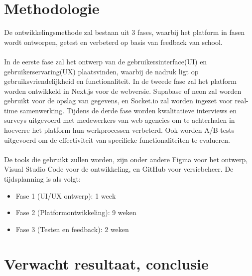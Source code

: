 

\section{Methodologie}%
\label{sec:methodologie}

De ontwikkelingsmethode zal bestaan uit 3 fases, waarbij het platform in fasen wordt ontworpen, getest en verbeterd op basis van feedback van school.
\\
\\
In de eerste fase zal het ontwerp van de gebruikersinterface(UI) en gebruikerservaring(UX) plaatsvinden, waarbij de nadruk ligt op gebruiksvriendelijkheid en functionaliteit. In de tweede fase zal het platform worden ontwikkeld in Next.js voor de webversie. Supabase of neon zal worden gebruikt voor de opslag van gegevens, en Socket.io zal worden ingezet voor real-time samenwerking. Tijdens de derde fase worden kwalitatieve interviews en surveys uitgevoerd met medewerkers van web agencies om te achterhalen in hoeverre het platform hun werkprocessen verbeterd. Ook worden A/B-tests uitgevoerd om de effectiviteit van specifieke functionaliteiten te evalueren.
\\
\\
De tools die gebruikt zullen worden, zijn onder andere Figma voor het ontwerp, Visual Studio Code voor de ontwikkeling, en GitHub voor versiebeheer. De tijdsplanning is als volgt:

\begin{itemize}
    \item Fase 1 (UI/UX ontwerp): 1 week
    \item Fase 2 (Platformontwikkeling): 9 weken
    \item Fase 3 (Testen en feedback): 2 weken
    
\end{itemize}

\section{Verwacht resultaat, conclusie}%
\label{sec:verwachte_resultaten}

